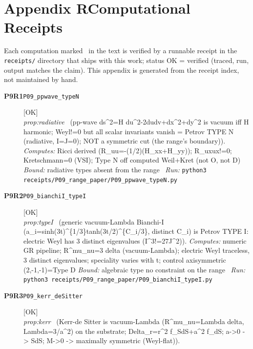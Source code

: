\clearpage
\section*{Appendix R\quad Computational Receipts}\label{app:receipts}
\small\noindent Each computation marked \rcptmarker\ in the text is verified by a runnable receipt in the \texttt{receipts/} directory that ships with this work; status \textsf{OK} = verified (traced, run, output matches the claim). This appendix is generated from the receipt index, not maintained by hand.\par\medskip
\begingroup\renewcommand{\arraystretch}{1.25}
\begin{description}
\item[\textbf{P9R1}\quad\texttt{P09\_ppwave\_typeN}]\hfill\textsf{[OK]}\\
\textit{prop:radiative} \ (pp-wave ds\textasciicircum{}2=H du\textasciicircum{}2-2dudv+dx\textasciicircum{}2+dy\textasciicircum{}2 is vacuum iff H harmonic; Weyl!=0 but all scalar invariants vanish = Petrov TYPE N (radiative, I=J=0); NOT a symmetric cut (the range's boundary)). 
\emph{Computes:} Ricci derived (R\_uu=-(1/2)(H\_xx+H\_yy)); R\_uxux!=0; Kretschmann=0 (VSI); Type N off computed Weil+Kret (not O, not D)
 \emph{Bound:} radiative types absent from the range
\ \emph{Run:} \texttt{python3 receipts/P09\_range\_paper/P09\_ppwave\_typeN.py}
\item[\textbf{P9R2}\quad\texttt{P09\_bianchiI\_typeI}]\hfill\textsf{[OK]}\\
\textit{prop:typeI} \ (generic vacuum-Lambda Bianchi-I (a\_i=sinh(3t)\textasciicircum{}\{1/3\}tanh(3t/2)\textasciicircum{}\{C\_i/3\}, distinct C\_i) is Petrov TYPE I: electric Weyl has 3 distinct eigenvalues (I\textasciicircum{}3!=27J\textasciicircum{}2)). 
\emph{Computes:} numeric GR pipeline; R\textasciicircum{}mu\_nu=3 delta (vacuum-Lambda); electric Weyl traceless, 3 distinct eigenvalues; speciality varies with t; control axisymmetric (2,-1,-1)=Type D
 \emph{Bound:} algebraic type no constraint on the range
\ \emph{Run:} \texttt{python3 receipts/P09\_range\_paper/P09\_bianchiI\_typeI.py}
\item[\textbf{P9R3}\quad\texttt{P09\_kerr\_deSitter}]\hfill\textsf{[OK]}\\
\textit{prop:kerr} \ (Kerr-de Sitter is vacuum-Lambda (R\textasciicircum{}mu\_nu=Lambda delta, Lambda=3/a\textasciicircum{}2) on the substrate; Delta\_r=r\textasciicircum{}2 f\_SdS+a\textasciicircum{}2 f\_dS; a->0 -> SdS; M->0 -> maximally symmetric (Weyl-flat)). 

\end{description}
